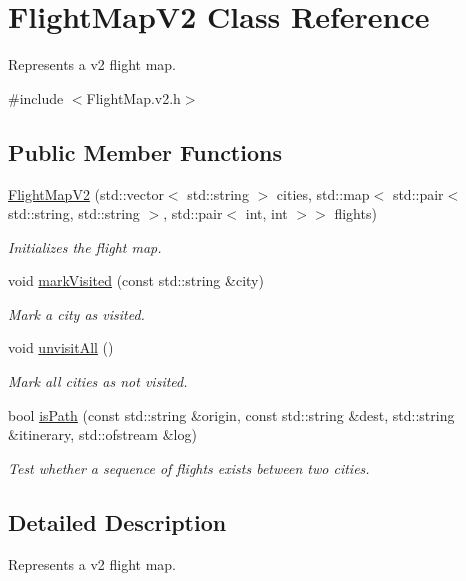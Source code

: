 \hypertarget{class_flight_map_v2}{}\section{Flight\+Map\+V2 Class Reference}
\label{class_flight_map_v2}


Represents a v2 flight map.  




{\ttfamily \#include $<$Flight\+Map.\+v2.\+h$>$}

\subsection*{Public Member Functions}
\begin{DoxyCompactItemize}
\item 
\hyperlink{class_flight_map_v2_a0f882f53198e7ba460d51d4d777017fc}{Flight\+Map\+V2} (std\+::vector$<$ std\+::string $>$ cities, std\+::map$<$ std\+::pair$<$ std\+::string, std\+::string $>$, std\+::pair$<$ int, int $>$$>$ flights)
\begin{DoxyCompactList}\small\item\em Initializes the flight map. \end{DoxyCompactList}\item 
void \hyperlink{class_flight_map_v2_a78ae7c6857f96399c852b764c4ceb80a}{mark\+Visited} (const std\+::string \&city)
\begin{DoxyCompactList}\small\item\em Mark a city as visited. \end{DoxyCompactList}\item 
void \hyperlink{class_flight_map_v2_ad23ad1ac569a15ada42363c0d4b87645}{unvisit\+All} ()
\begin{DoxyCompactList}\small\item\em Mark all cities as not visited. \end{DoxyCompactList}\item 
bool \hyperlink{class_flight_map_v2_a14ba2c33937affdaf0598cd3134ed8b2}{is\+Path} (const std\+::string \&origin, const std\+::string \&dest, std\+::string \&itinerary, std\+::ofstream \&log)
\begin{DoxyCompactList}\small\item\em Test whether a sequence of flights exists between two cities. \end{DoxyCompactList}\end{DoxyCompactItemize}


\subsection{Detailed Description}
Represents a v2 flight map. 

